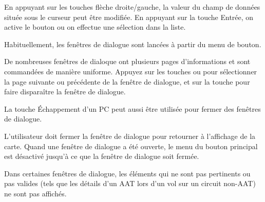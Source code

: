 En appuyant sur les touches flèche droite/gauche, la valeur du champ de données située sous le
curseur peut être modifiée. En appuyant sur la touche Entrée, on active le bouton ou
on effectue une sélection dans la liste.

Habituellement, les fenêtres de dialogue sont lancées à partir du menu de bouton.

De nombreuses fenêtres de dialoque ont plusieurs pages d'informations et sont commandées
de manière uniforme. Appuyez sur les touches \bmenuw{$<$} ou \bmenuw{$>$} pour
sélectionner la page suivante ou précédente de la fenêtre de dialogue, et sur la touche 
pour faire disparaître la fenêtre de dialogue.

La touche Échappement d'un PC peut aussi être utilisée pour fermer des fenêtres de dialogue.

L'utilisateur doit fermer la fenêtre de dialogue pour retourner à l'affichage de la carte. Quand une fenêtre de dialogue
a été ouverte, le menu du bouton principal est désactivé jusqu'à ce que la fenêtre de dialogue soit fermée.

Dans certaines fenêtres de dialogue, les éléments qui ne sont pas pertinents ou pas valides (tels que les détails d'un AAT lors
d'un vol sur un circuit non-AAT) ne sont pas affichés.

